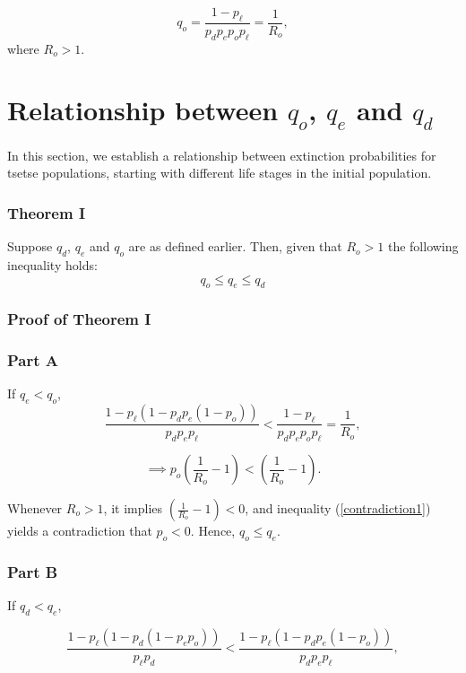\documentclass[smallextended]{svjour3}
\begin{document}
\begin{equation}
\label{extinctionYoungadult}
q_{o} = \frac{1-p_{\ell}}{p_{d}p_{e}p_{o}p_{\ell}} = \frac{1}{R_{o}},
\end{equation}
where $R_o > 1$.

\section{Relationship between $q_{o}$, $q_{e}$ and $q_{d}$}

In this section, we establish a relationship between extinction probabilities for tsetse populations, starting with different life stages in the initial population. 

\subsubsection*{Theorem I}
Suppose $q_{d}$, $q_{e}$ and $q_{o}$ are as defined earlier. Then,  given that $R_{o}>1$ the following inequality holds:
\begin{equation}
\label{Aretsetsetheorem}
q_{o}\leq q_{e} \leq q_{d}
\end{equation}

\subsubsection{Proof of Theorem I}
\subsubsection{Part A}
If  $q_{e} < q_{o}$, %
$$ \frac{1- p_{\ell}(1 -p_{d}p_{e}(1- p_{o}))}{p_{d}p_{e}p_{\ell}} < \frac{1-p_{\ell}}{p_{d}p_{e}p_{o}p_{\ell}} = \frac{1}{R_{o}}, $$

\begin{equation}
\label{contradiction1}
\implies      p_{o}(\frac{1}{R_{o}} - 1) < (\frac{1}{R_{o}}-1). 
\end{equation}

Whenever $R_{o} > 1$, it implies $(\frac{1}{R_{o}}-1) < 0$, and inequality (\ref{contradiction1}) yields a contradiction that $p_{o}<0$. Hence, $q_{o} \leq q_{e}$. 
\subsubsection{Part B}
If $q_{d} < q_{e}$,

$$  \frac{1-p_{\ell}(1 - p_{d}(1 - p_{e}p_{o}))}{p_{\ell}p_{d}}  <  \frac{1- p_{\ell}(1 -p_{d}p_{e}(1- p_{o}))}{p_{d}p_{e}p_{\ell}},  $$
\end{document}
